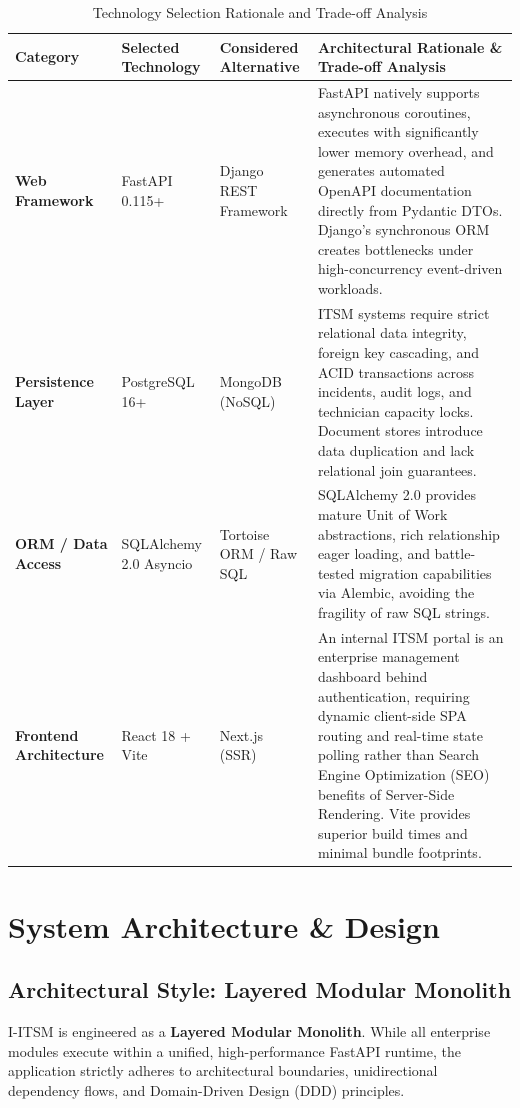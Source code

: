 \documentclass[11pt,a4paper,oneside]{report}
\begin{document}
\begin{table}[H]
\centering
\small
\caption{Technology Selection Rationale and Trade-off Analysis}
\label{tab:tech_tradeoffs}
\begin{tabular}{p{2.6cm}p{3.2cm}p{3.5cm}p{5.5cm}}
\toprule
\textbf{Category} & \textbf{Selected Technology} & \textbf{Considered Alternative} & \textbf{Architectural Rationale \& Trade-off Analysis} \\
\midrule
\textbf{Web Framework} & FastAPI 0.115+ & Django REST Framework & FastAPI natively supports asynchronous coroutines, executes with significantly lower memory overhead, and generates automated OpenAPI documentation directly from Pydantic DTOs. Django's synchronous ORM creates bottlenecks under high-concurrency event-driven workloads. \\
\addlinespace
\textbf{Persistence Layer} & PostgreSQL 16+ & MongoDB (NoSQL) & ITSM systems require strict relational data integrity, foreign key cascading, and ACID transactions across incidents, audit logs, and technician capacity locks. Document stores introduce data duplication and lack relational join guarantees. \\
\addlinespace
\textbf{ORM / Data Access} & SQLAlchemy 2.0 Asyncio & Tortoise ORM / Raw SQL & SQLAlchemy 2.0 provides mature Unit of Work abstractions, rich relationship eager loading, and battle-tested migration capabilities via Alembic, avoiding the fragility of raw SQL strings. \\
\addlinespace
\textbf{Frontend Architecture} & React 18 + Vite & Next.js (SSR) & An internal ITSM portal is an enterprise management dashboard behind authentication, requiring dynamic client-side SPA routing and real-time state polling rather than Search Engine Optimization (SEO) benefits of Server-Side Rendering. Vite provides superior build times and minimal bundle footprints. \\
\bottomrule
\end{tabular}
\end{table}


\chapter{System Architecture \& Design}
\label{ch:architecture}

\section{Architectural Style: Layered Modular Monolith}
\label{sec:arch_style}
I-ITSM is engineered as a \textbf{Layered Modular Monolith}. While all enterprise modules execute within a unified, high-performance FastAPI runtime, the application strictly adheres to architectural boundaries, unidirectional dependency flows, and Domain-Driven Design (DDD) principles. 
\end{document}
